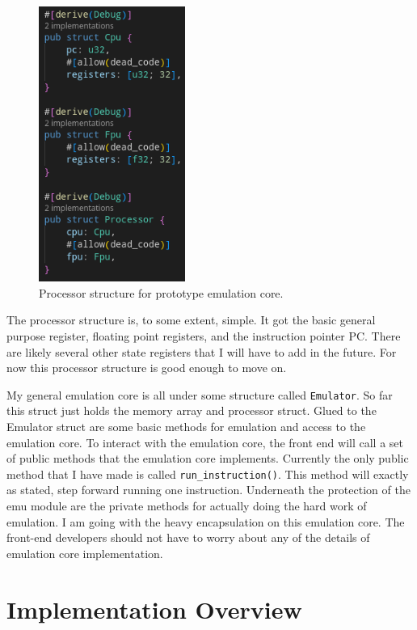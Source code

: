 \documentclass[
    paper=letter,
    parskip=half,
    fontsize=12pt,
    titlepage=firstiscover,
    toc=bibliography,
    numbers=endperiod
]{scrartcl}
\let\oldsection\section
\renewcommand{\section}{\newpage\oldsection}
\begin{document}
\begin{figure}[H]
    \includegraphics[height=9cm]{kevin-emulation-core-prototype}
    \caption{Processor structure for prototype emulation core.}
    \label{fig:kevin-emulation-core-prototype}
\end{figure}

The processor structure is, to some extent, simple. It got the basic
general purpose register, floating point registers, and the instruction
pointer PC. There are likely several other state registers that I will
have to add in the future. For now this processor structure is good
enough to move on.

My general emulation core is all under some structure called
\texttt{Emulator}. So far this struct just holds the memory array and
processor struct. Glued to the Emulator struct are some basic methods
for emulation and access to the emulation core. To interact with the
emulation core, the front end will call a set of public methods that the
emulation core implements. Currently the only public method that I have
made is called \texttt{run\_instruction()}. This method will exactly as
stated, step forward running one instruction. Underneath the protection
of the emu module are the private methods for actually doing the hard
work of emulation. I am going with the heavy encapsulation on this
emulation core. The front-end developers should not have to worry about
any of the details of emulation core implementation.

\section{Implementation Overview}
\end{document}
